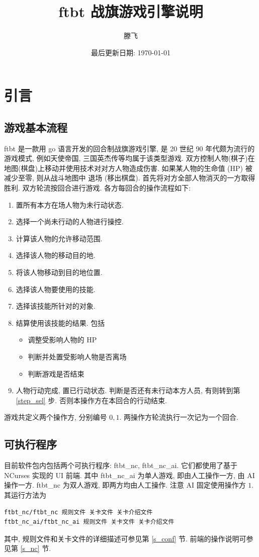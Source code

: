 \documentclass[UTF8, zihao=-4]{ctexart} %
\title{ftbt 战旗游戏引擎说明}
\date{最后更新日期: \today}
\author{滕飞}
\begin{document}
\maketitle

\section{引言}
\subsection{游戏基本流程}
\label{s_intro}
ftbt 是一款用 go 语言开发的回合制战旗游戏引擎, 是 20 世纪 90 年代颇为流行的游戏模式, 例如天使帝国, 三国英杰传等均属于该类型游戏. 
双方控制人物(棋子)在地图(棋盘)上移动并使用技术对对方人物造成伤害. 如果某人物的生命值 (HP) 被减少至零, 则从战斗地图中
退场 (移出棋盘). 首先将对方全部人物消灭的一方取得胜利. 双方轮流按回合进行游戏. 各方每回合的操作流程如下: 
\begin{enumerate}
      \item 置所有本方在场人物为未行动状态.
      \item \label{step_sel}选择一个尚未行动的人物进行操控.
      \item 计算该人物的允许移动范围.
      \item \label{step_move}选择该人物的移动目的地.
      \item 将该人物移动到目的地位置.
      \item \label{step_tech}选择该人物要使用的技能.
      \item \label{step_obj}选择该技能所针对的对象.
      \item 结算使用该技能的结果. 包括
            \begin{itemize}
                  \item 调整受影响人物的 HP
                  \item 判断并处置受影响人物是否离场
                  \item 判断游戏是否结束
            \end{itemize}
      \item 人物行动完成, 置已行动状态. 判断是否还有未行动本方人员, 有则转到第 \ref{step_sel} 步. 否则本操作方在本回合的行动结束.
\end{enumerate}
游戏共定义两个操作方, 分别编号 $0, 1$. 两操作方轮流执行一次记为一个回合.

\subsection{可执行程序}
\label{s_exec}
目前软件包内包括两个可执行程序: ftbt\_nc, ftbt\_nc\_ai. 
它们都使用了基于 NCurses 实现的 UI 前端. 其中 ftbt\_nc\_ai 为单人游戏, 即由人工操作一方, 由 AI 操作一方.
ftbt\_nc 为双人游戏, 即两方均由人工操作. 注意 AI 固定使用操作方 $1$.
其运行方法为
\begin{lstlisting}[language=bash]
ftbt_nc/ftbt_nc 规则文件 关卡文件 关卡介绍文件
ftbt_nc_ai/ftbt_nc_ai 规则文件 关卡文件 关卡介绍文件
\end{lstlisting}
其中, 规则文件和关卡文件的详细描述可参见第 \ref{s_conf} 节. 前端的操作说明可参见第 \ref{s_nc} 节.
\end{document}
